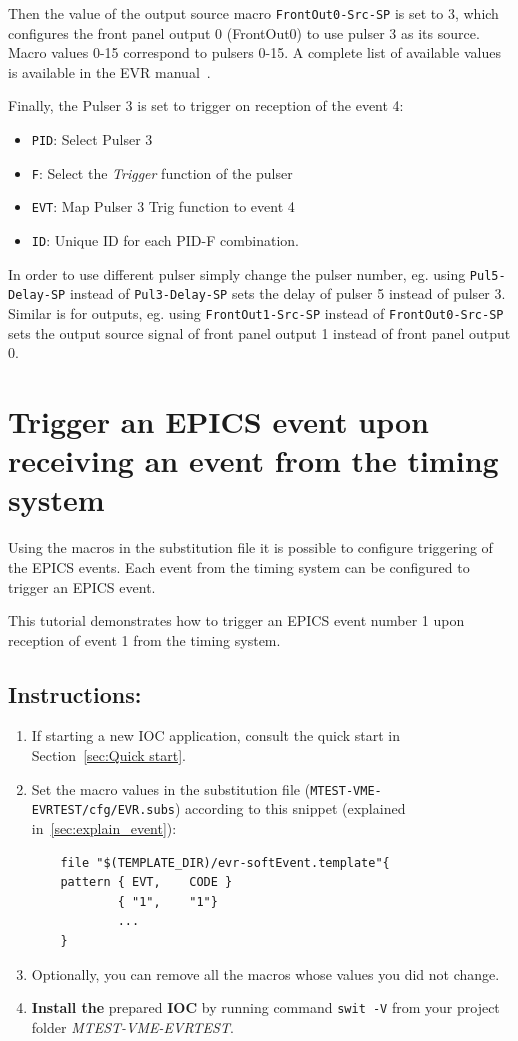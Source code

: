 \documentclass[12pt,a4paper]{article}
\begin{document}
Then the value of the output source macro \texttt{FrontOut0-Src-SP} is set to 3, which configures the front panel output 0 (FrontOut0) to use pulser 3 as its source. Macro values 0-15 correspond to pulsers 0-15. A complete list of available values is available in the EVR manual~\cite{evr_manual}.

Finally, the Pulser 3 is set to trigger on reception of the event 4:
\begin{itemize}
	\item \texttt{PID}: Select Pulser 3
	\item \texttt{F}: Select the \textit{Trigger} function of the pulser
	\item \texttt{EVT}: Map Pulser 3 Trig function to event 4
	\item \texttt{ID}: Unique ID for each PID-F combination.
\end{itemize}

In order to use different pulser simply change the pulser number, eg. using \texttt{Pul5-Delay-SP} instead of \texttt{Pul3-Delay-SP} sets the delay of pulser 5 instead of pulser 3.
Similar is for outputs, eg. using \texttt{FrontOut1-Src-SP} instead of \texttt{FrontOut0-Src-SP} sets the output source signal of front panel output 1 instead of front panel output 0.

\section{Trigger an EPICS event upon receiving an event from the timing system}
Using the macros in the substitution file it is possible to configure triggering of the EPICS events. Each event from the timing system can be configured to trigger an EPICS event.

This tutorial demonstrates how to trigger an EPICS event number 1 upon reception of event 1 from the timing system.

\subsection{Instructions:}
\begin{enumerate}
	\item If starting a new IOC application, consult the quick start in Section~\ref{sec:Quick start}.
	
	\item Set the macro values in the substitution file (\texttt{MTEST-VME-EVRTEST/cfg/EVR.subs}) according to this snippet (explained in~\ref{sec:explain_event}):
\begin{verbatim}
	file "$(TEMPLATE_DIR)/evr-softEvent.template"{
	pattern { EVT,    CODE }
	        { "1",    "1"}
	        ...
	}
\end{verbatim}
	\item Optionally, you can remove all the macros whose values you did not change. 

	\item \textbf{Install the} prepared \textbf{IOC} by running command \texttt{swit -V} from your project folder \textit{MTEST-VME-EVRTEST}.
\end{enumerate}
\end{document}
